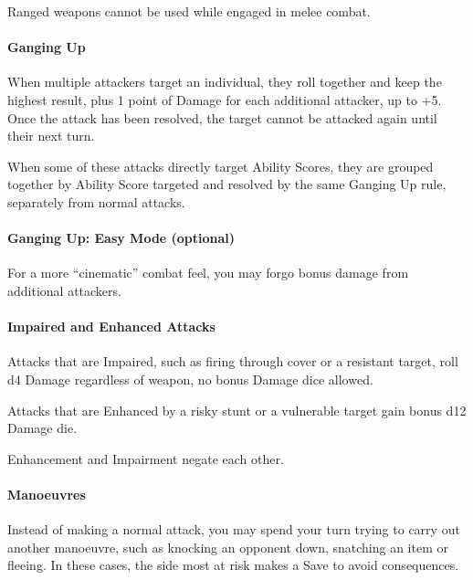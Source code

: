 \documentclass[itdr]{subfiles}
\begin{document}
Ranged weapons cannot be used while engaged in melee combat.

\vfill

\paragraph{Ganging Up}
When multiple attackers target an individual, they roll together and keep the highest result, plus 1 point of Damage for each additional attacker, up to +5. Once the attack has been resolved, the target cannot be attacked again until their next turn.

When some of these attacks directly target Ability Scores, they are grouped together by Ability Score targeted and resolved by the same Ganging Up rule, separately from normal attacks.

\vfill

\begin{dbox}
\paragraph{Ganging Up: Easy Mode (optional)}
For a more ``cinematic'' combat feel, you may forgo bonus damage from additional attackers.
\end{dbox}

\vfill
\break

\paragraph{Impaired and Enhanced Attacks}
Attacks that are Impaired, such as firing through cover or a resistant target, roll d4 Damage regardless of weapon, no bonus Damage dice allowed.

Attacks that are Enhanced by a risky stunt or a vulnerable target gain bonus d12 Damage die.

Enhancement and Impairment negate each other.

\vfill
\paragraph{Manoeuvres}
Instead of making a normal attack, you may spend your turn trying to carry out another manoeuvre, such as knocking an opponent down, snatching an item or fleeing. In these cases, the side most at risk makes a Save to avoid consequences.
\end{document}
